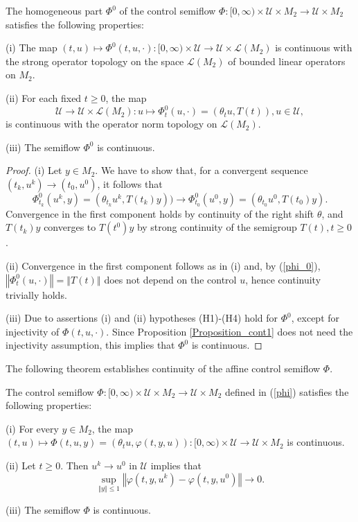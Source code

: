 \documentclass{siamltex}%
\begin{document}
\begin{proposition}
\label{Proposition_continuous}The homogeneous part $\Phi^{0}$ of the control
semiflow $\Phi:[0,\infty)\times\mathcal{U}\times M_{2}\rightarrow
\mathcal{U}\times M_{2}$ satisfies the following properties:

(i) The map $(t,u)\mapsto\Phi^{0}(t,u,\cdot):[0,\infty)\times\mathcal{U}%
\rightarrow\mathcal{U}\times\mathcal{L}(M_{2})$ is continuous with the strong
operator topology on the space $\mathcal{L}(M_{2})$ of bounded linear
operators on $M_{2}$.

(ii) For each fixed $t\geq0$, the map%
\[
\mathcal{U}\rightarrow\mathcal{U}\times\mathcal{L}(M_{2}):u\mapsto\Phi_{t}%
^{0}(u,\cdot)=(\theta_{t}u,T(t)),u\in\mathcal{U},
\]
is continuous with the operator norm topology on $\mathcal{L}(M_{2})$.

(iii) The semiflow $\Phi^{0}$ is continuous.
\end{proposition}

\begin{proof}
(i) Let $y\in M_{2}$. We have to show that, for a convergent sequence
$(t_{k},u^{k})\rightarrow(t_{0},u^{0})$, it follows that%
\[
\Phi_{t_{k}}^{0}(u^{k},y)=(\theta_{t_{k}}u^{k},T(t_{k})y))\rightarrow
\Phi_{t_{0}}^{0}(u^{0},y)=(\theta_{t_{0}}u^{0},T(t_{0})y).
\]
Convergence in the first component holds by continuity of the right shift
$\theta$, and $T(t_{k})y$ converges to $T(t^{0})y$ by strong continuity of the
semigroup $T(t),t\geq0$.\ 

(ii) Convergence in the first component follows as in (i) and, by
(\ref{phi_0}), $\left\Vert \Phi_{t}^{0}(u,\cdot)\right\Vert =\left\Vert
T(t)\right\Vert $ does not depend on the control $u$, hence continuity
trivially holds.

(iii) Due to assertions (i) and (ii) hypotheses (H1)-(H4) hold for $\Phi^{0}$,
except for injectivity of $\Phi(t,u,\cdot)$. Since Proposition
\ref{Proposition_cont1} does not need the injectivity assumption, this implies
that $\Phi^{0}$ is continuous.
\end{proof}

The following theorem establishes continuity of the affine control semiflow
$\Phi$.

\begin{theorem}
\label{Theorem_continuous}The control semiflow $\Phi:[0,\infty)\times
\mathcal{U}\times M_{2}\rightarrow\mathcal{U}\times M_{2}$ defined in
(\ref{phi}) satisfies the following properties:

(i) For every $y\in M_{2}$, the map $(t,u)\mapsto\Phi(t,u,y)=(\theta
_{t}u,\varphi(t,y,u)):[0,\infty)\times\mathcal{U}\rightarrow\mathcal{U}\times
M_{2}$ is continuous.

(ii) Let $t\geq0$. Then $u^{k}\rightarrow u^{0}$ in $\mathcal{U}$ implies that%
\[
\sup_{\left\Vert y\right\Vert \leq1}\left\Vert \varphi(t,y,u^{k}%
)-\varphi(t,y,u^{0})\right\Vert \rightarrow0.
\]


(iii) The semiflow $\Phi$ is continuous.
\end{theorem}
\end{document}
